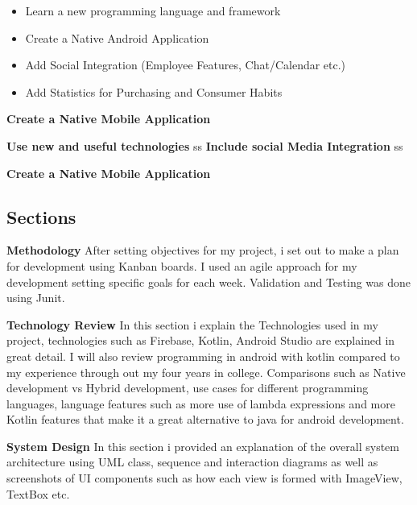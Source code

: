 \begin{itemize}
    \item Learn a new programming language and framework
    \item Create a Native Android Application
    \item Add Social Integration (Employee Features, Chat/Calendar etc.) 
    \item Add Statistics for Purchasing and Consumer Habits
\end{itemize}

\textbf {Create a Native Mobile Application} 
\newline

\textbf {Use new and useful technologies}
ss \newline
\textbf {Include social Media Integration}
ss \newline

\textbf {Create a Native Mobile Application} \newline

\newpage

\subsection{Sections}

\textbf {Methodology}
After setting objectives for my project, i set out to make a plan for development using Kanban boards. I used an agile approach for my development setting specific goals for each week. Validation and Testing was done using Junit.
\newline


\textbf {Technology Review}
In this section i explain the Technologies used in my project, technologies such as Firebase, Kotlin, Android Studio are explained in great detail. I will also review programming in android with kotlin compared to my experience through out my four years in college. Comparisons such as Native development vs Hybrid development, use cases for different programming languages, language features such as more use of lambda expressions and more Kotlin features that make it a great alternative to java for android development.
\newline


\textbf {System Design}
In this section i provided an explanation of the overall system architecture using UML class, sequence and interaction diagrams as well as screenshots of UI components such as how each view is formed with ImageView, TextBox etc. \newline

